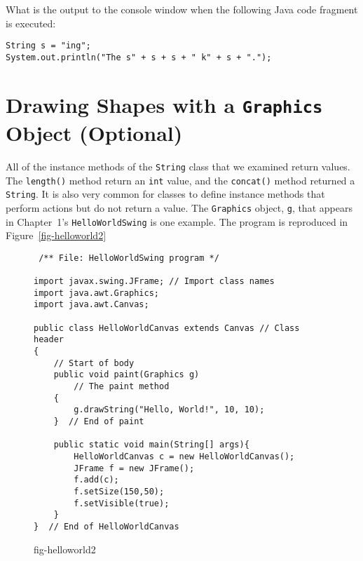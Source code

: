 
\label{self-study-exercises}
\begin{SSTUDY}

\item
What is the output to the console window when the following
Java code fragment is executed:

\begin{jjjlisting}
\begin{lstlisting}
String s = "ing";
System.out.println("The s" + s + s + " k" + s + ".");
\end{lstlisting}
\end{jjjlisting}

\end{SSTUDY}


\section{Drawing Shapes with a {\tt Graphics} Object (Optional)}
\label{drawing-shapeswitha-object-optional}

All of the instance methods of the {\tt String} class that we examined
return values. The {\tt length()} method return an {\tt int} value,
and the {\tt concat()} method returned a {\tt String}.  It is also
very common for classes to define instance methods that perform
actions but do not return a value. The {\tt Graphics} object, {\tt g},
that appears in Chapter~1's {\tt HelloWorldSwing} is one
example. The program is reproduced in Figure~\ref{fig-helloworld2}
\begin{figure}[h!]
\jjjprogstart
\begin{jjjlisting}
\begin{lstlisting}
 /** File: HelloWorldSwing program */

import javax.swing.JFrame; // Import class names
import java.awt.Graphics;
import java.awt.Canvas;

public class HelloWorldCanvas extends Canvas // Class header
{                                            
    // Start of body
    public void paint(Graphics g)           
        // The paint method
    {
        g.drawString("Hello, World!", 10, 10);
    }  // End of paint

    public static void main(String[] args){
        HelloWorldCanvas c = new HelloWorldCanvas();
        JFrame f = new JFrame();
        f.add(c);
        f.setSize(150,50);
        f.setVisible(true);
    }
}  // End of HelloWorldCanvas

\end{lstlisting}
\end{jjjlisting}
{fig-helloworld2}
\end{figure}

